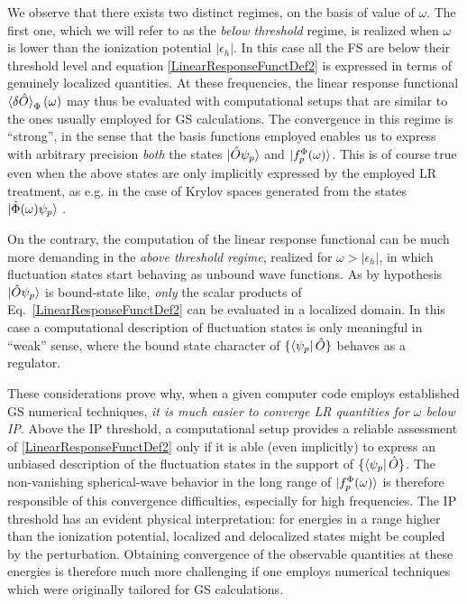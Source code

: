 \documentclass[reprint,aps,prb]{revtex4-1}
\newcommand{\eps}{\epsilon}
\newcommand{\op}[1]{\hat {#1}}
\begin{document}
We observe that there exists two 
distinct regimes, on the basis of value of $\omega$. 
The first one, which we will refer to as the \emph{below threshold} regime, is realized when
$\omega$ is lower than the ionization potential $|\eps_h|$.
In this case all the FS are below their threshold level and equation \eqref{LinearResponseFunctDef2} 
is expressed in terms of genuinely localized 
quantities. At these frequencies, the linear response functional $\braket{\delta\op O}_\Phi(\omega)$
may thus be evaluated with computational setups that
are similar to the ones usually employed for GS calculations.
The convergence in this regime is ``strong'', in the sense that the basis functions employed enables us to express 
with arbitrary precision \emph{both} the states $\ket{\op O \psi_p}$ and $\ket{f_p^\Phi(\omega)}$.
This is of course true even when the above states are only implicitly expressed by the employed LR treatment,
 as e.g. in the case of Krylov spaces generated from the states $\ket{\op\Phi(\omega) \psi_p}$ \cite{baroni2006,baroni2008,linlinKPM}.

On the contrary, the computation of the linear response functional can be much more demanding in the \emph{above threshold regime}, realized for $\omega>|\eps_h|$, in which fluctuation 
states start behaving as unbound wave functions.
As by hypothesis $\ket{\op O \psi_p}$ is bound-state like, \emph{only} the scalar products of Eq.~\eqref{LinearResponseFunctDef2} can be evaluated in a localized domain.
In this case a computational description of fluctuation states is only meaningful in ``weak'' sense,
where the bound state character of $\{\bra{\psi_p}\op O\}$ behaves as a regulator.

These considerations prove why, when a given computer code employs established GS numerical techniques, 
\emph{it is much easier to converge LR quantities for $\omega$ below IP}.
Above the IP threshold, a computational setup 
provides a reliable assessment of \eqref{LinearResponseFunctDef2} only if it is able (even implicitly) to express an
unbiased description of the fluctuation states in the support of $\{\bra{\psi_p}\op O\}$.
The non-vanishing spherical-wave behavior in the long range of $\ket{f_p^\Phi(\omega)}$ is therefore responsible
of this convergence difficulties, especially for high frequencies.
The IP threshold has an evident physical interpretation: for energies in a range higher than the ionization potential,
localized and delocalized states might be coupled by the perturbation. Obtaining convergence of the observable quantities at these energies is therefore much more challenging if one employs 
numerical techniques which were originally tailored for GS calculations.
\end{document}
